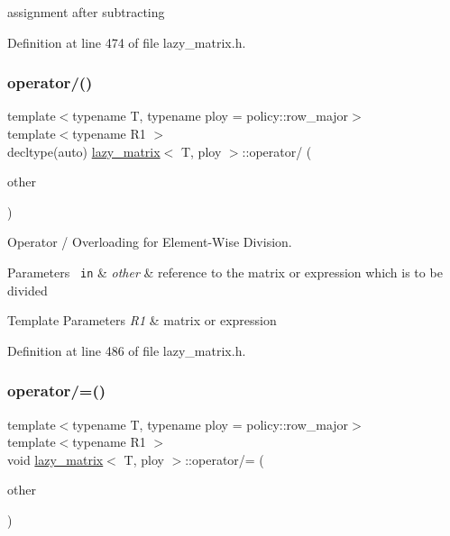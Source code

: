 assignment after subtracting 



Definition at line 474 of file lazy\+\_\+matrix.\+h.

\mbox{\label{classlazy__matrix_ada5c981ceba8ec0bd11afdbcb2c40a09}} 
\subsubsection{\texorpdfstring{operator/()}{operator/()}}
{\footnotesize\ttfamily template$<$typename T, typename ploy = policy\+::row\+\_\+major$>$ \\
template$<$typename R1 $>$ \\
decltype(auto) \mbox{\hyperlink{classlazy__matrix}{lazy\+\_\+matrix}}$<$ T, ploy $>$\+::operator/ (\begin{DoxyParamCaption}\item[{const R1 \&}]{other }\end{DoxyParamCaption})\hspace{0.3cm}{\ttfamily [inline]}}



Operator / Overloading for Element-\/\+Wise Division. 


\begin{DoxyParams}[1]{Parameters}
\mbox{\texttt{ in}}  & {\em other} & reference to the matrix or expression which is to be divided\\
\hline
\end{DoxyParams}

\begin{DoxyTemplParams}{Template Parameters}
{\em R1} & matrix or expression \\
\hline
\end{DoxyTemplParams}


Definition at line 486 of file lazy\+\_\+matrix.\+h.

\mbox{\label{classlazy__matrix_acffaec4e4abdb5984ac65aa0b8675e03}} 
\subsubsection{\texorpdfstring{operator/=()}{operator/=()}}
{\footnotesize\ttfamily template$<$typename T, typename ploy = policy\+::row\+\_\+major$>$ \\
template$<$typename R1 $>$ \\
void \mbox{\hyperlink{classlazy__matrix}{lazy\+\_\+matrix}}$<$ T, ploy $>$\+::operator/= (\begin{DoxyParamCaption}\item[{const R1 \&}]{other }\end{DoxyParamCaption})\hspace{0.3cm}{\ttfamily [inline]}}



